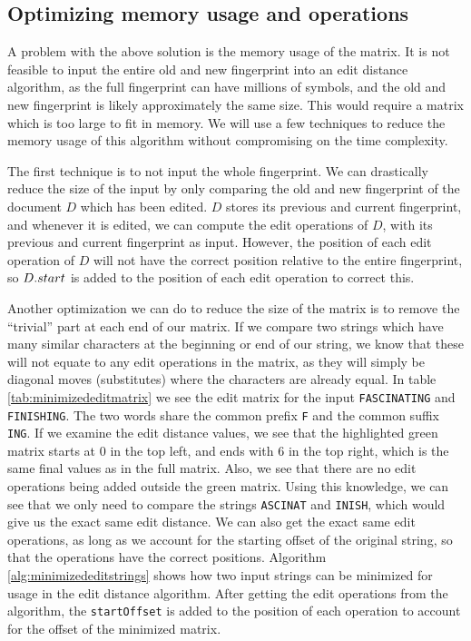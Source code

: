 \subsection*{Optimizing memory usage and operations}

A problem with the above solution is the memory usage of the matrix. It is not feasible to
input the entire old and new fingerprint into an edit distance algorithm, as the full
fingerprint can have millions of symbols, and the old and new fingerprint is likely
approximately the same size. This would require a matrix which is too large to fit in
memory. We will use a few techniques to reduce the memory usage of this algorithm without
compromising on the time complexity.

The first technique is to not input the whole fingerprint. We can drastically reduce the
size of the input by only comparing the old and new fingerprint of the document $D$ which
has been edited. $D$ stores its previous and current fingerprint, and whenever it is
edited, we can compute the edit operations of $D$, with its previous and current
fingerprint as input. However, the position of each edit operation of $D$ will not have
the correct position relative to the entire fingerprint, so ${{D}.{start}}$ is
added to the position of each edit operation to correct this.

Another optimization we can do to reduce the size of the matrix is to remove the
``trivial'' part at each end of our matrix. If we compare two strings which have many
similar characters at the beginning or end of our string, we know that these will not
equate to any edit operations in the matrix, as they will simply be diagonal moves
(substitutes) where the characters are already equal. In table
\ref{tab:minimizededitmatrix} we see the edit matrix for the input \verb|FASCINATING| and
\verb|FINISHING|. The two words share the common prefix \verb|F| and the common suffix
\verb|ING|. If we examine the edit distance values, we see that the highlighted green
matrix starts at $0$ in the top left, and ends with $6$ in the top right, which is the
same final values as in the full matrix. Also, we see that there are no edit operations
being added outside the green matrix. Using this knowledge, we can see that we only need
to compare the strings \verb|ASCINAT| and \verb|INISH|, which would give us the exact same
edit distance. We can also get the exact same edit operations, as long as we account for
the starting offset of the original string, so that the operations have the correct
positions. Algorithm \ref{alg:minimizededitstrings} shows how two input strings can be
minimized for usage in the edit distance algorithm. After getting the edit operations from
the algorithm, the \verb|startOffset| is added to the position of each operation to
account for the offset of the minimized matrix.

